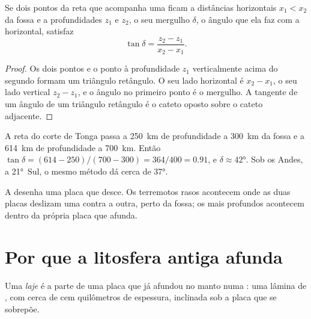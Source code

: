 \begin{proposition}\label{prop:g11:subduction-zones:dip}
Se dois pontos da reta que acompanha uma  ficam a
distâncias horizontais $x_1 < x_2$ da fossa e a profundidades $z_1$ e $z_2$,
o seu mergulho $\delta$, o ângulo que ela faz com a horizontal, satisfaz
\[
  \tan \delta = \frac{z_2 - z_1}{x_2 - x_1}.
\]
\end{proposition}

\begin{proof}
Os dois pontos e o ponto à profundidade $z_1$ verticalmente acima do segundo
formam um triângulo retângulo. O seu lado horizontal é $x_2 - x_1$, o seu
lado vertical $z_2 - z_1$, e o ângulo no primeiro ponto é o mergulho. A
tangente de um ângulo de um triângulo retângulo é o cateto oposto sobre o
cateto adjacente.
\end{proof}

\begin{example}\label{ex:g11:subduction-zones:dip}
A reta do corte de Tonga passa a \qty{250}{km} de profundidade a
\qty{300}{km} da fossa e a \qty{614}{km} de profundidade a \qty{700}{km}.
Então $\tan\delta = (614 - 250)/(700 - 300) = 364/400 = 0.91$, e
$\delta \approx \ang{42}$. Sob os Andes, a \ang{21}~Sul, o mesmo método dá
cerca de \ang{37}.
\end{example}

A  desenha uma placa que desce. Os terremotos rasos
acontecem onde as duas placas deslizam uma contra a outra, perto da fossa; os
mais profundos acontecem dentro da própria placa que afunda.

\section{Por que a litosfera antiga afunda}

\begin{definition}[Laje]\label{def:g11:subduction-zones:slab}
Uma \emph{laje} é a parte de uma placa que já afundou no manto
numa : uma lâmina de , com cerca de cem
quilômetros de espessura, inclinada sob a placa que se sobrepõe.
\end{definition}

